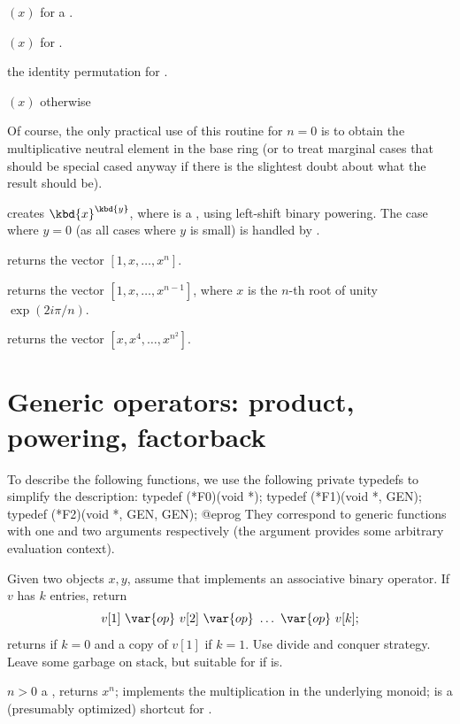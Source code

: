 \item {}$(x)$ for a .

\item {}$(x)$ for .

\item the identity permutation for .

\item {}$(x)$ otherwise

Of course, the only practical use of this routine for $n = 0$ is
to obtain the multiplicative neutral element in the base ring (or to treat
marginal cases that should be special cased anyway if there is the slightest
doubt about what the result should be).

 creates $\kbd{x}^{\kbd{y}}$, where  is a
, using left-shift binary powering. The case where $y = 0$
(as all cases where $y$ is small) is handled by .

 returns the vector $[1,x,\dots,x^n]$.

 returns the vector
$[1,x,\dots,x^{n-1}]$, where $x$ is the $n$-th root of unity $\exp(2i\pi/n)$.

 returns the vector $[x,x^4,\dots,x^{n^2}]$.

\section{Generic operators: product, powering, factorback}

To describe the following functions, we use the following private typedefs
to simplify the description:
\bprog
  typedef (*F0)(void *);
  typedef (*F1)(void *, GEN);
  typedef (*F2)(void *, GEN, GEN);
@eprog
\noindent They correspond to generic functions with one and two arguments
respectively (the  argument provides some arbitrary evaluation
context).

Given two objects $x,y$, assume that  implements an
associative binary operator. If $v$ has $k$ entries, return
$$v[1]~\var{op}~v[2]~\var{op}~\ldots ~\var{op}~v[k];$$
returns  if $k = 0$ and a copy of $v[1]$ if $k = 1$.
Use divide and conquer strategy. Leave some garbage on stack, but suitable for
 if  is.

 $n > 0$ a
, returns $x^n$;  implements the multiplication
in the underlying monoid;  is a (presumably optimized) shortcut for
.

